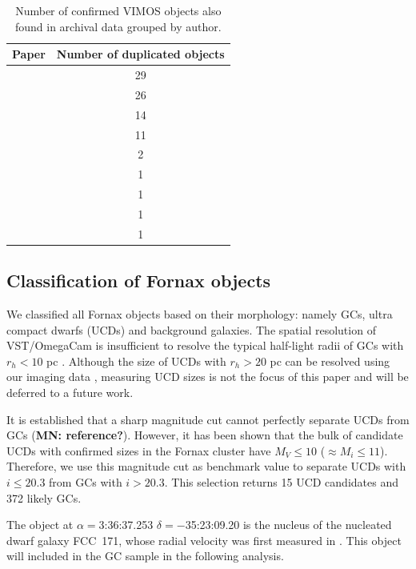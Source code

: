 \documentclass[useAMS,usenatbib]{mn2e}
\newcommand{\kms}{\mbox{\,km~s$^{-1}$}}
\begin{document}
\begin{table}
\centering
\label{mathmode}
\begin{tabular}{@{}l c}
\hline
Paper & Number of duplicated objects \\
\hline
\citet{Dirsch04}       &  29 \\
\citet{Schuberth}      &  26 \\
\citet{Bergond07}      &  14 \\
\citet{Firth07}        &  11 \\
\citet{Chilingarian11} &  2  \\
\citet{Mieske04}       &  1  \\
\citet{Hilker07}       &  1  \\
\citet{Francis12}      &  1  \\
\citet{Drinkwater00}   &  1  \\
\hline
\end{tabular}
\caption{Number of confirmed VIMOS objects also found in archival data grouped 
by author.}
\label{tab:authors} 
\end{table}

\subsection{Classification of Fornax objects}

We classified all Fornax objects based on their morphology: namely GCs, ultra 
compact dwarfs (UCDs) and background galaxies. The spatial resolution of 
VST/OmegaCam is insufficient to resolve the typical half-light radii of GCs 
with $r_h < 10$ pc \citep{Masters, Puzia11}. Although the size of UCDs with 
$r_h > 20$ pc can be resolved using our imaging data \citep{Cantiello15}, 
measuring UCD sizes is not the focus of this paper and will be deferred to a 
future work.

It is established that a sharp magnitude cut cannot perfectly separate UCDs 
from GCs ({\bf MN: reference?}). However, it has been shown \citep{Voggel16, 
Eigenthaler18} that the bulk of candidate UCDs with confirmed sizes in the Fornax cluster 
have $M_V \le 10$ ($\approx M_i \le 11$). 
Therefore, we use this magnitude cut as benchmark value to separate UCDs with 
$i \le 20.3$ from GCs with $i > 20.3$. This selection returns 15 UCD candidates 
and 372 likely GCs. 

The object at $\alpha=$3:36:37.253 $\delta=-$35:23:09.20 is the nucleus of the 
nucleated dwarf galaxy FCC~171, whose radial velocity was first measured in 
\citet{Bergond07}. This object will included in the GC sample in the following 
analysis.  
\end{document}
